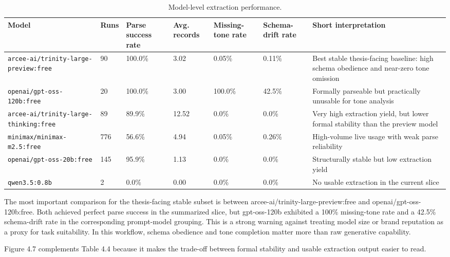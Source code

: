 \begin{table}[htbp]
\centering
\caption{Model-level extraction performance.}
\label{tab:model-level-extraction-performance}
\footnotesize
\setlength{\tabcolsep}{4pt}
\renewcommand{\arraystretch}{1.15}
\begin{tabularx}{\linewidth}{|X|p{1.8cm}|X|p{1.8cm}|p{1.8cm}|p{1.8cm}|X|}
\hline
\textbf{Model} & \textbf{Runs} & \textbf{Parse success rate} & \textbf{Avg. records} & \textbf{Missing-tone rate} & \textbf{Schema-drift rate} & \textbf{Short interpretation} \\ \hline
\texttt{arcee-ai/trinity-large-preview:free} & 90 & 100.0\% & 3.02 & 0.05\% & 0.11\%  & Best stable thesis-facing baseline: high schema obedience and near-zero tone omission \\ \hline
\texttt{openai/gpt-oss-120b:free} & 20 & 100.0\% & 3.00 & 100.0\% & 42.5\%  & Formally parseable but practically unusable for tone analysis \\ \hline
\texttt{arcee-ai/trinity-large-thinking:free} & 89 & 89.9\% & 12.52 & 0.0\% & 0.0\%  & Very high extraction yield, but lower formal stability than the preview model \\ \hline
\texttt{minimax/minimax-m2.5:free} & 776 & 56.6\% & 4.94 & 0.05\% & 0.26\%  & High-volume live usage with weak parse reliability \\ \hline
\texttt{openai/gpt-oss-20b:free} & 145 & 95.9\% & 1.13 & 0.0\% & 0.0\%  & Structurally stable but low extraction yield \\ \hline
\texttt{qwen3.5:0.8b} & 2 & 0.0\% & 0.00 & 0.0\% & 0.0\%  & No usable extraction in the current slice \\ \hline
\end{tabularx}
\end{table}

The most important comparison for the thesis-facing stable subset is between arcee-ai/trinity-large-preview:free and openai/gpt-oss-120b:free. Both achieved perfect parse success in the summarized slice, but gpt-oss-120b exhibited a 100\% missing-tone rate and a 42.5\% schema-drift rate in the corresponding prompt-model grouping. This is a strong warning against treating model size or brand reputation as a proxy for task suitability. In this workflow, schema obedience and tone completion matter more than raw generative capability.

Figure 4.7 complements Table 4.4 because it makes the trade-off between formal stability and usable extraction output easier to read.

